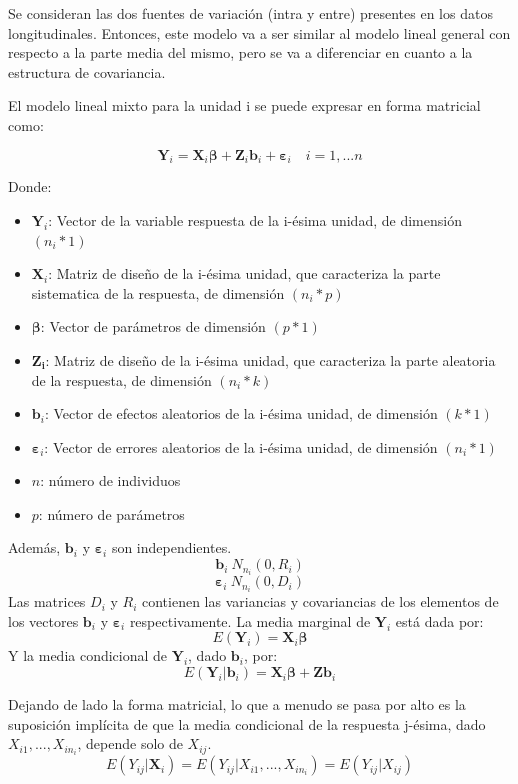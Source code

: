 \documentclass[12pt]{article}
\def\xseqn{$X_{i1}, ..., X_{in_i}$}
\begin{document}
Se consideran las dos fuentes de variación (intra y entre) presentes en los datos longitudinales. Entonces, este modelo va
a ser similar al modelo lineal general con respecto a la parte media del mismo, pero se va a diferenciar en cuanto a la
estructura de covariancia.

El modelo lineal mixto para la unidad i se puede expresar en forma matricial como:

\begin{equation}
	\bm{Y}_i = \bm{X}_i\bm{\beta} + \bm{Z}_i\bm{b}_i + \bm{\varepsilon}_i \quad i = 1, ... n
\end{equation}

Donde:
\begin{itemize}
	\item $\bm{Y}_i$: Vector de la variable respuesta de la i-ésima unidad, de dimensión $(n_i*1)$
	\item $\bm{X}_i$: Matriz de diseño de la i-ésima unidad, que caracteriza la parte sistematica de la respuesta,
	de dimensión $(n_i*p)$
	\item $\bm{\beta}$: Vector de parámetros de dimensión $(p*1)$
	\item $\bm{Z_i}$: Matriz de diseño de la i-ésima unidad, que caracteriza la parte aleatoria de la respuesta,
	de dimensión $(n_i*k)$
	\item $\bm{b}_i$: Vector de efectos aleatorios de la i-ésima unidad, de dimensión $(k*1)$
	\item $\bm{\varepsilon}_i$: Vector de errores aleatorios de la i-ésima unidad, de dimensión $(n_i*1)$
	\item $n$: número de individuos
	\item $p$: número de parámetros
\end{itemize}
Además, $\bm{b}_i$ y $\bm{\varepsilon}_i$ son independientes.
\[ \bm{b}_i ~ N_{n_i}(0, R_i) \]
\[ \bm{\varepsilon}_i ~ N_{n_i}(0, D_i) \]
Las matrices $D_i$ y $R_i$ contienen las variancias y covariancias de los elementos de los vectores
$\bm{b}_i$ y $\bm{\varepsilon}_i$ respectivamente.
La media marginal de $\bm{Y}_i$ está dada por:
\begin{equation}
	E(\bm{Y}_i) = \bm{X}_i\bm{\beta}
\end{equation}
Y la media condicional de $\bm{Y}_i$, dado $\bm{b}_i$, por:
\begin{equation}
	E(\bm{Y}_i|\bm{b}_i) = \bm{X}_i\bm{\beta} + \bm{Z}\bm{b}_i
\end{equation}

Dejando de lado la forma matricial, lo que a menudo se pasa por alto es la suposición implícita de que la media
condicional de la respuesta j-ésima, dado \xseqn{}, depende solo de $X_{ij}$.
\begin{equation}
\label{esperanza}
	E(Y_{ij}|\bm{X}_i) = E(Y_{ij}|X_{i1}, ..., X_{in_i}) = E(Y_{ij}|X_{ij})
\end{equation}
\end{document}
